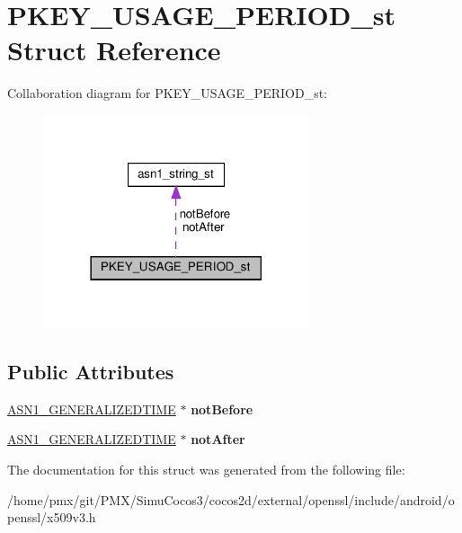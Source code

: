 \hypertarget{structPKEY__USAGE__PERIOD__st}{}\section{P\+K\+E\+Y\+\_\+\+U\+S\+A\+G\+E\+\_\+\+P\+E\+R\+I\+O\+D\+\_\+st Struct Reference}
\label{structPKEY__USAGE__PERIOD__st}


Collaboration diagram for P\+K\+E\+Y\+\_\+\+U\+S\+A\+G\+E\+\_\+\+P\+E\+R\+I\+O\+D\+\_\+st\+:
\nopagebreak
\begin{figure}[H]
\begin{center}
\leavevmode
\includegraphics[width=222pt]{structPKEY__USAGE__PERIOD__st__coll__graph}
\end{center}
\end{figure}
\subsection*{Public Attributes}
\begin{DoxyCompactItemize}
\item 
\mbox{\label{structPKEY__USAGE__PERIOD__st_aa6ba4caba883e70114f2f334294b84e1}} 
\hyperlink{structasn1__string__st}{A\+S\+N1\+\_\+\+G\+E\+N\+E\+R\+A\+L\+I\+Z\+E\+D\+T\+I\+ME} $\ast$ {\bfseries not\+Before}
\item 
\mbox{\label{structPKEY__USAGE__PERIOD__st_a7d69f5949dfdcc3f91b7eb75dc2faa22}} 
\hyperlink{structasn1__string__st}{A\+S\+N1\+\_\+\+G\+E\+N\+E\+R\+A\+L\+I\+Z\+E\+D\+T\+I\+ME} $\ast$ {\bfseries not\+After}
\end{DoxyCompactItemize}


The documentation for this struct was generated from the following file\+:\begin{DoxyCompactItemize}
\item 
/home/pmx/git/\+P\+M\+X/\+Simu\+Cocos3/cocos2d/external/openssl/include/android/openssl/x509v3.\+h\end{DoxyCompactItemize}
